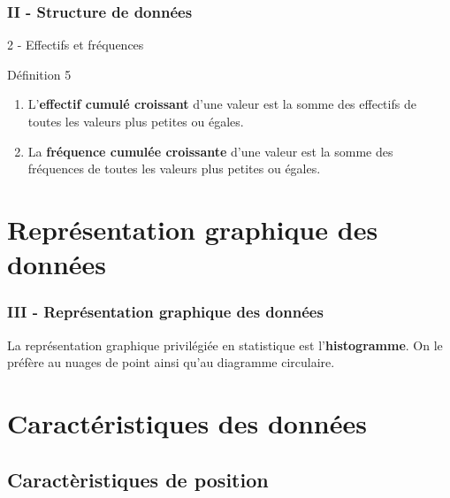\documentclass{beamer}
\begin{document}
\begin{frame}
  \frametitle{II - Structure de données}

  \begin{block}{2 - Effectifs et fréquences}
    \begin{alertblock}{Définition 5}
      \begin{enumerate}
      \item L'\textbf{effectif cumulé croissant} d'une valeur est la somme des effectifs de toutes les valeurs plus petites ou égales.
      \item La \textbf{fréquence cumulée croissante} d'une valeur est la somme des fréquences de toutes les valeurs plus petites ou égales.
      \end{enumerate}
    \end{alertblock}
  \end{block}
\end{frame}


\section{Représentation graphique des données}

\begin{frame}
  \frametitle{III - Représentation graphique des données}

  \begin{exampleblock}{}
    La représentation graphique privilégiée en statistique est l'\textbf{histogramme}. On le préfère au nuages de point ainsi qu'au diagramme circulaire.
  \end{exampleblock}
\end{frame}

\section{Caractéristiques des données}
\subsection{Caractèristiques de position}
\end{document}
